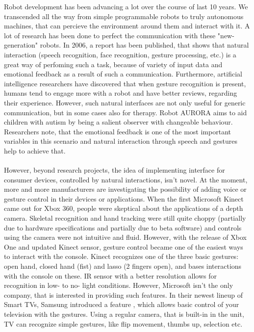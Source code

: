 \documentclass[a4paper,11pt,oneside]{article}
\begin{document}
  Robot development has been advancing a lot over the course of last 10 years. We transcended all the way from simple programmable robots to truly autonomous machines, that can percieve the environment around them and interact with it. A lot of research has been done to perfect the communication with these "new-generation" robots. In 2006, a report \cite{SA01} has been published, that shows that natural interaction (speech recognition, face recognition, gesture processing, etc.) is a great way of perfoming such a task, because of variety of input data and emotional feedback as a result of such a communication. Furthermore, artificial intelligence researchers \cite{SA02} have discovered that when gesture recognition is present, humans tend to engage more with a robot and have better reviews, regarding their experience. However, such natural interfaces are not only useful for generic communication, but in some cases also for therapy. Robot AURORA \cite{SA03} aims to aid children with autism by being a salient observer with changeable behaviour. Researchers note, that the emotional feedback is one of the most important variables in this scenario and natural interaction through speech and gestures help to achieve that.\\
  \\
  However, beyond research projects, the idea of implementing interface for consumer devices, controlled by natural interactions, isn't novel. At the moment, more and more manufacturers are investigating the possibility of adding voice or gesture control in their devices or applications. When the first Microsoft Kinect came out for Xbox 360, people were skeptical about the applications of a depth camera. Skeletal recognition and hand tracking were still quite choppy (partially due to hardware specifications and partially due to beta software) and controls using the camera were not intuitive and fluid. However, with the release of Xbox One and updated Kinect sensor, gesture control became one of the easiest ways to interact with the console. Kinect recognizes one of the three basic gestures: open hand, closed hand (fist) and lasso (2 fingers open), and bases interactions with the console on these. IR sensor with a better resolution allows for recognition in low- to no- light conditions. However, Microsoft isn't the only company, that is interested in providing such features. In their newest lineup of Smart TVs, Samsung introduced a feature \cite{SM01}, which allows basic control of your television with the gestures. Using a regular camera, that is built-in in the unit, TV can recognize simple gestures, like flip movement, thumbs up, selection etc. \\
\end{document}
